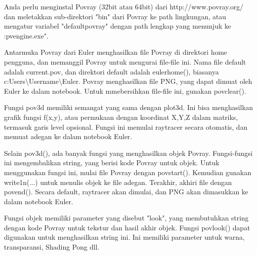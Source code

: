\documentclass{article}
\begin{document}
\begin{eulernotebook}
\begin{eulercomment}
\begin{eulercomment}
\begin{eulercomment}
Anda perlu menginstal Povray (32bit atau 64bit) dari
http://www.povray.org/\\
dan meletakkan sub-direktori "bin" dari Povray ke path lingkungan,
atau mengatur variabel "defaultpovray" dengan path lengkap yang
menunjuk ke :pvengine.exe".

Antarmuka Povray dari Euler menghasilkan file Povray di direktori home
pengguna, dan memanggil Povray untuk mengurai file-file ini. Nama file
default adalah current.pov, dan direktori default adalah eulerhome(),
biasanya c:Users\textbackslash{}Username\textbackslash{}Euler. Povray menghasilkan file PNG, yang
dapat dimuat oleh Euler ke dalam notebook. Untuk mmebersihkan
file-file ini, gunakan povclear().

Fungsi pov3d memiliki semangat yang sama dengan plot3d. Ini bisa
menghasilkan grafik fungsi f(x,y), atau permukaan dengan koordinat
X,Y,Z dalam matriks, termasuk garis level opsional. Fungsi ini memulai
raytracer secara otomatis, dan memuat adegan ke dalam notebook Euler.

Selain pov3d(), ada banyak fungsi yang menghasilkan objek Povray.
Fungsi-fungsi ini mengembalikan string, yang berisi kode Povray untuk
objek. Untuk menggunakan fungsi ini, mulai file Povray dengan
povstart(). Kemudian gunakan write1n(...) untuk menulis objek ke file
adegan. Terakhir, akhiri file dengan povend(). Secara default,
raytracer akan dimulai, dan PNG akan dimasukkan ke dalam notebook
Euler.

Fungsi objek memiliki parameter yang disebut "look", yang membutuhkan
string dengan kode Povray untuk tekstur dan hasil akhir objek. Fungsi
povlook() dapat digunakan untuk menghasilkan string ini. Ini memiliki
parameter untuk warna, transparansi, Shading Pong dll.


\end{eulercomment}
\end{eulercomment}
\end{eulercomment}
\end{eulernotebook}
\end{document}
